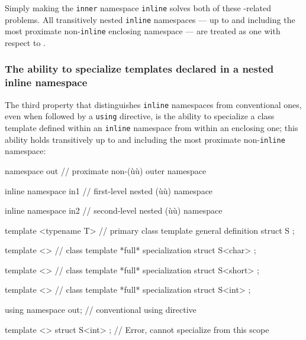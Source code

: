 Simply making the \lstinline!inner! namespace \lstinline!inline! solves both
of these -related problems. All transitively nested
\lstinline!inline! namespaces --- up to and including the most proximate
non-\lstinline!inline! enclosing namespace --- are treated as one with
respect to .

\subsubsection[The ability to specialize templates declared in a nested \lstinline!inline! namespace]{The ability to specialize templates declared in a nested {\SubsubsecCode inline} namespace}\label{the-ability-to-specialize-templates-declared-in-a-nested-inline-namespace}

The third property that distinguishes \lstinline!inline! namespaces from
conventional ones, even when followed by a \lstinline!using! directive, is
the ability to specialize a class template defined within an
\lstinline!inline! namespace from within an enclosing one; this ability
holds transitively up to and including the most proximate
non-\lstinline!inline! namespace:

\begin{emcppslisting}[emcppserrorlines={24}]
namespace out                      // proximate non-(ù{}ù) outer namespace
{
    inline namespace in1           // first-level nested (ù{}ù) namespace
    {
        inline namespace in2       // second-level nested (ù{}ù) namespace
        {
            template <typename T>  // primary class template general definition
            struct S { };

            template <>            // class template *full* specialization
            struct S<char> { };
        }

        template <>                // class template *full* specialization
        struct S<short> { };
    }

    template <>                    // class template *full* specialization
    struct S<int> { };
}

using namespace out;               // conventional using directive

template <>
struct S<int> { };                 // Error, cannot specialize from this scope
\end{emcppslisting}

